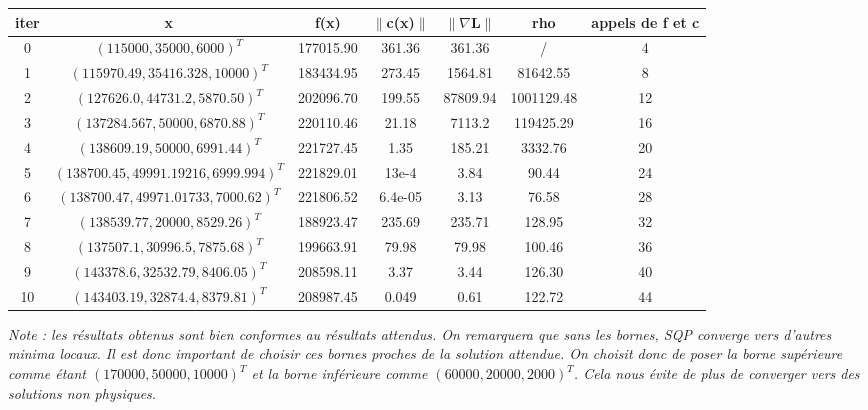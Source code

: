 {\renewcommand{\arraystretch}{1.5}
\begin{table}[h]\centering \small\begin{tabular}{|c|c|c|c|c|c|c|}
	\hline
 	iter & x & f(x) & $\| $c(x)$ \|$ & $\|    \nabla $L$  \|$ & rho & appels de f et c\\
	\hline
	0 & $(115000, 35000, 6000)^{T}$ & 177015.90 & 361.36 & 361.36 & / & 4\\
	\hline
	1 & $(115970.49, 35416.328, 10000)^{T}$ & 183434.95 & 273.45 & 1564.81 & 81642.55 & 8\\
	\hline
	2 & $(127626.0, 44731.2, 5870.50)^{T}$ & 202096.70 & 199.55 & 87809.94 & 1001129.48 & 12\\
	\hline
	3 & $(137284.567, 50000, 6870.88 )^{T}$ & 220110.46 & 21.18 & 7113.2 & 119425.29 & 16\\
	\hline
	4 & $(138609.19, 50000, 6991.44 )^{T}$ & 221727.45 & 1.35& 185.21 & 3332.76 & 20\\
	\hline
	5 & $(138700.45, 49991.19216, 6999.994 )^{T}$ & 221829.01 & 13e-4 & 3.84 & 90.44 & 24\\
	\hline
	6 & $(138700.47, 49971.01733, 7000.62 )^{T}$ & 221806.52 & 6.4e-05 & 3.13 & 76.58 & 28\\
	\hline
	7 & $(138539.77, 20000, 8529.26 )^{T}$ & 188923.47 & 235.69 &235.71 & 128.95 & 32\\
	\hline
	8 & $(137507.1, 30996.5, 7875.68)^{T}$ & 199663.91 &  79.98 & 79.98 & 100.46 & 36\\
	\hline
	9 & $(143378.6, 32532.79, 8406.05 )^{T}$ & 208598.11 & 3.37 & 3.44 & 126.30 & 40\\
	\hline
	10 & $(143403.19, 32874.4, 8379.81 )^{T}$ & 208987.45 & 0.049 & 0.61 & 122.72 & 44\\
	\hline
\end{tabular}
\end{table}}
\bigbreak
\textit{Note : les résultats obtenus sont bien conformes au résultats attendus. On remarquera que sans les bornes, SQP converge vers d'autres minima locaux. Il est donc important de choisir ces bornes proches de la solution attendue. On choisit donc de poser la borne supérieure comme étant $(170000 , 50000 , 10000)^{T}$ et la borne inférieure comme $(60000 , 20000 , 2000)^{T}$. Cela nous évite de plus de converger vers des solutions non physiques.}

